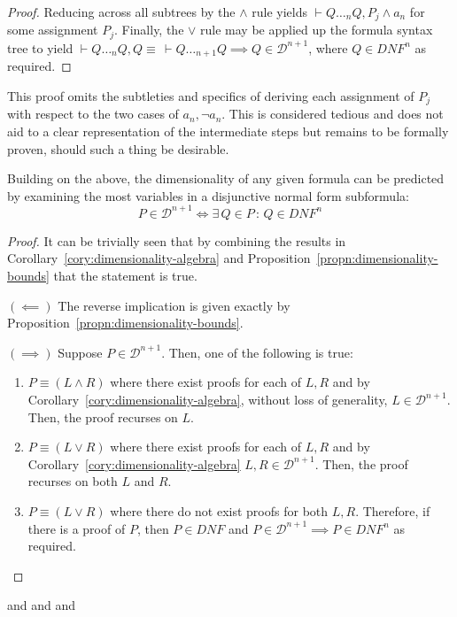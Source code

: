 \begin{proof}
        Reducing across all subtrees by the $\wedge$ rule yields $\vdash Q \ldots_n Q, P_j \wedge a_n$ for some assignment $P_j$.
        Finally, the $\vee$ rule may be applied up the formula syntax tree to yield $\vdash Q \ldots_{n} Q, Q \equiv \, \vdash Q \ldots_{n+1} Q \implies Q \in \mathcal{D}^{n+1}$, where $Q \in \textit{DNF}^n$ as required.
    \end{proof}

    \begin{remark}\label{remark:proof-subtleties}
        This proof omits the subtleties and specifics of deriving each assignment of $P_j$ with respect to the two cases of $a_n, \neg a_n$.
        This is considered tedious and does not aid to a clear representation of the intermediate steps but remains to be formally proven, should such a thing be desirable.
    \end{remark}


    \begin{proposition*}
        Building on the above, the dimensionality of any given formula can be predicted by examining the most variables in a disjunctive normal form subformula:
        \begin{equation*}
            P \in \mathcal{D}^{n+1} \iff \exists \, Q \in P \,:\, Q \in DNF^{n}
        \end{equation*}
    \end{proposition*}

    \begin{proof}
        It can be trivially seen that by combining the results in Corollary~\ref{cory:dimensionality-algebra} and Proposition~\ref{propn:dimensionality-bounds} that the statement is true.
        
        $(\impliedby)$
        The reverse implication is given exactly by Proposition~\ref{propn:dimensionality-bounds}.

        $(\implies)$
        Suppose $P \in \mathcal{D}^{n+1}$.
        Then, one of the following is true:

        \begin{enumerate}
            \item
            $P \equiv (L \wedge R)$  where there exist proofs for each of $L, R$ and by Corollary~\ref{cory:dimensionality-algebra}, without loss of generality, $L \in \mathcal{D}^{n+1}$.
            Then, the proof recurses on $L$.

            \item
            $P \equiv (L \vee R)$ where there exist proofs for each of $L, R$ and by Corollary~\ref{cory:dimensionality-algebra} $L, R \in \mathcal{D}^{n+1}$.
            Then, the proof recurses on both $L$ and $R$.

            \item
            $P \equiv (L \vee R)$ where there do not exist proofs for both $L, R$.
            Therefore, if there is a proof of $P$, then $P \in \textit{DNF}$ and $P \in \mathcal{D}^{n+1} \implies P \in \textit{DNF}^n$ as required.
        \end{enumerate}
    \end{proof}

    
    \begin{remarks}
        \citet{tableaux-for-logic-of-proofs} and
        \citet{connection-based-proof-method} and
        \citet{matrices-with-connections} and
        \citet{proving-by-matings}
    \end{remarks}

